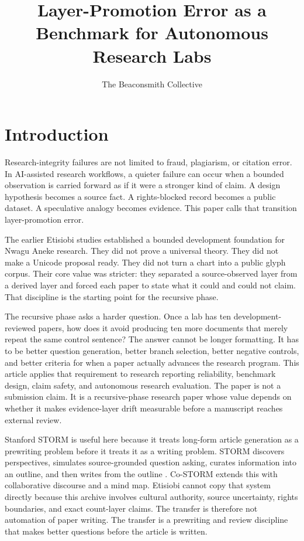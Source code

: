 \documentclass[sigconf,nonacm]{acmart}
\title{Layer-Promotion Error as a Benchmark for Autonomous Research Labs}
\author{The Beaconsmith Collective}
\affiliation{\institution{Etisiobi Research Studio}\city{Enugu}\country{Nigeria}}
\begin{document}
\maketitle

\section{Introduction}
Research-integrity failures are not limited to fraud, plagiarism, or citation
error. In AI-assisted research workflows, a quieter failure can occur when a
bounded observation is carried forward as if it were a stronger kind of claim.
A design hypothesis becomes a source fact. A rights-blocked record becomes a
public dataset. A speculative analogy becomes evidence. This paper calls that
transition layer-promotion error.

The earlier Etisiobi studies established a bounded development foundation for
Nwagu Aneke research. They did not prove a universal theory. They did not make a
Unicode proposal ready. They did not turn a chart into a public glyph corpus.
Their core value was stricter: they separated a source-observed layer from a
derived layer and forced each paper to state what it could and could not claim.
That discipline is the starting point for the recursive phase.

The recursive phase asks a harder question. Once a lab has ten development-reviewed
papers, how does it avoid producing ten more documents that merely repeat the
same control sentence? The answer cannot be longer formatting. It has to be
better question generation, better branch selection, better negative controls,
and better criteria for when a paper actually advances the research program.
This article applies that requirement to research reporting reliability,
benchmark design, claim safety, and autonomous research evaluation. The paper is
not a submission claim. It is a recursive-phase research paper whose value
depends on whether it makes evidence-layer drift measurable before a manuscript
reaches external review.

Stanford STORM is useful here because it treats long-form article generation as
a prewriting problem before it treats it as a writing problem. STORM discovers
perspectives, simulates source-grounded question asking, curates information
into an outline, and then writes from the outline \cite{shao2024storm,jiang2024costorm,gao2023alce,wadden2020scifact}. Co-STORM
extends this with collaborative discourse and a mind map. Etisiobi cannot copy
that system directly because this archive involves cultural authority, source
uncertainty, rights boundaries, and exact count-layer claims. The transfer is
therefore not automation of paper writing. The transfer is a prewriting and
review discipline that makes better questions before the article is written.
\end{document}

